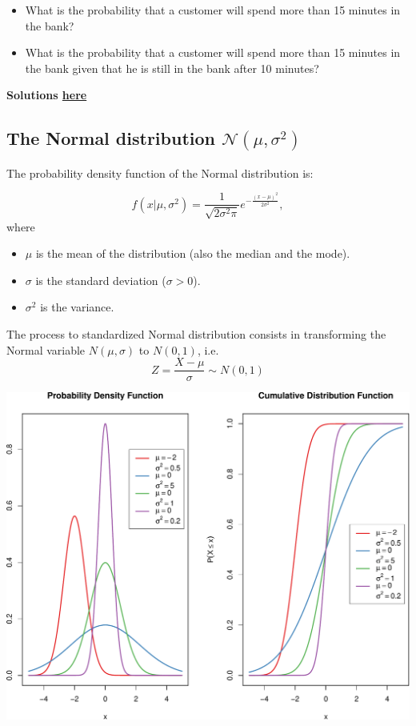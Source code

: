 \documentclass[]{article}
\def\tightlist{}
\numberwithin{equation}{section}
\begin{document}
\begin{itemize}
\tightlist
\item
  What is the probability that a customer will spend more than 15
  minutes in the bank?
\item
  What is the probability that a customer will spend more than 15
  minutes in the bank given that he is still in the bank after 10
  minutes?
\end{itemize}

\textbf{Solutions \href{IntroSM_sol.html}{here}}

\subsection{\texorpdfstring{The Normal distribution
\(\mathcal{N}(\mu,\sigma^2)\)}{The Normal distribution \textbackslash{}mathcal\{N\}(\textbackslash{}mu,\textbackslash{}sigma\^{}2)}}\label{the-normal-distribution-mathcalnmusigma2}

The probability density function of the Normal distribution is:

\[
f(x | \mu,\sigma^2) = \frac{1}{\sqrt{2\sigma^2\pi}} e ^{-\frac{(x-\mu)^2}{2\sigma^2}},
\] where

\begin{itemize}
\tightlist
\item
  \(\mu\) is the mean of the distribution (also the median and the
  mode).
\item
  \(\sigma\) is the standard deviation (\(\sigma>0\)).
\item
  \(\sigma^2\) is the variance.
\end{itemize}

The process to standardized Normal distribution consists in transforming
the Normal variable \(N(\mu,\sigma)\) to \(N(0,1)\), i.e. \[
Z = \frac{X-\mu}{\sigma} \sim N(0,1)
\]

\includegraphics{index_files/figure-latex/unnamed-chunk-150-1.pdf}
\end{document}
